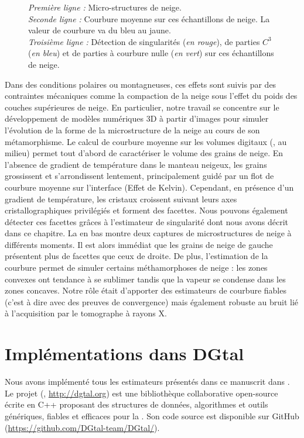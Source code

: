 \begin{figure}[ht]
{\begin{center}
    \end{center}}
    \caption{\emph{Première ligne :} Micro-structures de neige.\\
						 \emph{Seconde ligne :} Courbure moyenne sur ces échantillons de neige. La valeur de courbure va du bleu au jaune.\\
						 \emph{Troisième ligne :} Détection de singularités (\emph{en rouge}), de parties $C^3$ (\emph{en bleu}) et de parties à courbure nulle (\emph{en vert}) sur ces échantillons de neige.\\
      \label{fig:digitalSnow-curv}}
\end{figure}

Dans des conditions polaires ou montagneuses, ces effets sont suivis par des
contraintes mécaniques comme la compaction de la neige sous l'effet du poids des
couches supérieures de neige. En particulier, notre travail se concentre sur le
développement de modèles numériques 3D à partir d'images pour simuler
l'évolution de la forme de la microstructure de la neige au cours de son
métamorphisme. Le calcul de courbure moyenne sur les volumes digitaux
(, au milieu) permet tout d'abord de
caractériser le volume des grains de neige. En l'absence de gradient de
température dans le manteau neigeux, les grains grossissent et s'arrondissent
lentement, principalement guidé par un flot de courbure moyenne sur l'interface
(Effet de Kelvin). Cependant, en présence d'un gradient de température, les
cristaux croissent suivant leurs axes cristallographiques privilégiés et forment
des facettes. Nous pouvons également détecter ces facettes grâces à l'estimateur
de singularité dont nous avons décrit dans ce chapitre. La
 en bas montre deux captures de microstructures
de neige à différents moments. Il est alors immédiat que les grains de neige de
gauche présentent plus de facettes que ceux de droite. De plus, l'estimation de
la courbure permet de simuler certains méthamorphoses de neige : les zones
convexes ont tendance à se sublimer tandis que la vapeur se condense dans les
zones concaves. Notre rôle était d'apporter des estimateurs de courbure fiables
(c'est à dire avec des preuves de convergence) mais également robuste au bruit
lié à l'acquisition par le tomographe à rayons X.

\section{Implémentations dans DGtal}%
\label{sec:applications:dgtal}
%
Nous avons implémenté tous les estimateurs présentés dans ce manuscrit dans
\DGtal \cite{DGtal}. Le projet \DGtal (,
\url{http://dgtal.org}) est une bibliothèque collaborative open-source écrite en
\textsc{C++} proposant des structures de données, algorithmes et outils
génériques, fiables et efficaces pour la \DigitalGeometry. Son code source est
disponible sur GitHub (\url{https://github.com/DGtal-team/DGtal/}).

